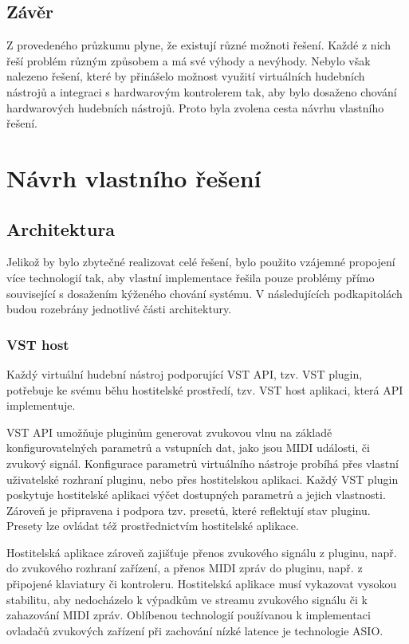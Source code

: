 \documentclass[thesis=M,czech]{FITthesis}[2019/03/06]
\begin{document}
	\section{Závěr}
		Z provedeného průzkumu plyne, že existují různé možnoti řešení. Každé z nich řeší problém různým způsobem a má své výhody a nevýhody.
		Nebylo však nalezeno řešení, které by přinášelo možnost využití virtuálních hudebních nástrojů a integraci s hardwarovým kontrolerem tak,
		aby bylo dosaženo chování hardwarových hudebních nástrojů. Proto byla zvolena cesta návrhu vlastního řešení.

\chapter{Návrh vlastního řešení}
	\section{Architektura}
		Jelikož by bylo zbytečné realizovat celé řešení, bylo použito vzájemné propojení více technologií tak,
		aby vlastní implementace řešila pouze problémy přímo související s dosažením kýženého chování systému. V následujících podkapitolách
		budou rozebrány jednotlivé části architektury.
		
		\subsection{VST host}
			Každý virtuální hudební nástroj podporující VST API\cite{vstdoc}, tzv. VST plugin, potřebuje ke svému běhu hostitelské prostředí, tzv. VST host aplikaci, která API implementuje\cite{vstdoc}.
			
			VST API umožňuje pluginům generovat zvukovou vlnu na základě konfigurovatelných
			parametrů a vstupních dat, jako jsou MIDI události, či zvukový signál.
			Konfigurace parametrů virtuálního nástroje probíhá přes vlastní uživatelské rozhraní pluginu, nebo přes hostitelskou aplikaci.
			Každý VST plugin poskytuje hostitelské aplikaci výčet dostupných parametrů a jejich vlastnosti.
			Zároveň je připravena i podpora tzv. presetů, které reflektují stav pluginu. Presety lze ovládat též prostřednictvím
			hostitelské aplikace.
			
			Hostitelská aplikace zároveň zajišťuje přenos zvukového signálu z pluginu, např. do zvukového rozhraní zařízení,
			a přenos MIDI zpráv do pluginu, např. z připojené klaviatury či kontroleru. Hostitelská aplikace musí vykazovat
			vysokou stabilitu, aby nedocházelo k výpadkům ve streamu zvukového signálu či k zahazování MIDI zpráv. Oblíbenou 
			technologií používanou k implementaci ovladačů zvukových zařízení při zachování nízké latence je technologie ASIO\cite{asio}.
			
\end{document}
